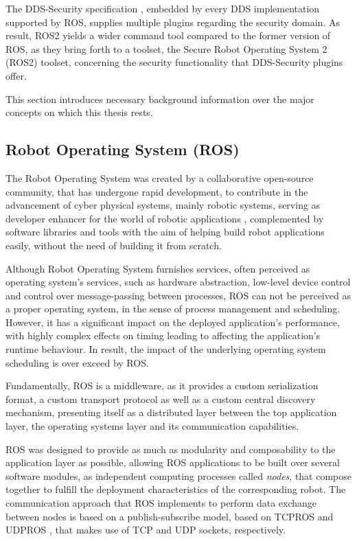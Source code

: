 The DDS-Security specification \cite{ros-dds-integration}, embedded by every DDS implementation supported by ROS, supplies multiple plugins regarding the security domain. As result, ROS2 yields a wider command tool compared to the former version of ROS, as they bring forth to a toolset, the Secure Robot Operating System 2 (ROS2) toolset, concerning the security functionality that DDS-Security plugins offer.

This section introduces necessary background information over the major concepts on which this thesis rests. 


\subsection{Robot Operating System (ROS)}

The Robot Operating System was created by a collaborative open-source community, that has undergone rapid development, to contribute in the advancement of cyber physical systems, mainly robotic systems, serving as developer enhancer for the world of robotic applications \cite{diluoffo2018robot}, complemented by software libraries and tools with the aim of helping build robot applications easily, without the need of building it from scratch.

Although Robot Operating System furnishes services, often perceived as operating system's services, such as hardware abstraction, low-level device control and control over message-passing between processes, ROS can not be perceived as a proper operating system, in the sense of process management and scheduling. However, it has a significant impact on the deployed application's performance, with highly complex effects on timing leading to affecting the application's runtime behaviour. In result, the impact of the underlying operating system scheduling is over exceed by ROS. \cite{intro-ros, casini2019response} 

Fundamentally, ROS is a middleware, as it provides a custom serialization format, a custom transport protocol as well as a custom central discovery mechanism, presenting itself as a distributed layer between the top application layer, the operating systems layer and its communication capabilities. 

ROS was designed to provide as much as modularity and composability to the application layer \cite{casini2019response} as possible, allowing ROS applications to be built over several software modules, as independent computing processes called \textit{nodes}, that compose together to fulfill the deployment characteristics of the corresponding robot. \cite{maruyama2016exploring} The communication approach that ROS implements to perform data exchange between nodes is based on a publish-subscribe model, based on TCPROS \cite{tcpros} and UDPROS \cite{udpros}, that makes use of TCP and UDP sockets, respectively. \cite{maruyama2016exploring}

